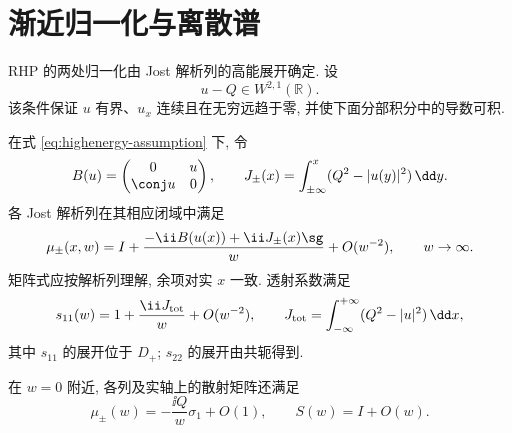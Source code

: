 \section{渐近归一化与离散谱}
RHP 的两处归一化由 Jost 解析列的高能展开确定. 设
\begin{equation}\label{eq:highenergy-assumption}
u-Q\in W^{2,1}(\mathbb R).
\end{equation}
该条件保证 $u$ 有界、$u_x$ 连续且在无穷远趋于零, 并使下面分部积分中的导数可积.
\begin{proposition}[一致高能展开]\label{prop:highenergy}
在式 \eqref{eq:highenergy-assumption} 下, 令
\[
B(u)=\begin{pmatrix}0&u\\\conj u&0\end{pmatrix},\qquad
J_\pm(x)=\int_{\pm\infty}^{x}(Q^2-|u(y)|^2)\,\dd y.
\]
各 Jost 解析列在其相应闭域中满足
\begin{equation}\label{eq:mu-highenergy}
\mu_\pm(x,w)
=I+\dfrac{-\ii B(u(x))+\ii J_\pm(x)\sg}{w}
+O(w^{-2}),\qquad w\to\infty.
\end{equation}
矩阵式应按解析列理解, 余项对实 $x$ 一致. 透射系数满足
\begin{equation}\label{eq:transmission-highenergy}
s_{11}(w)=1+\dfrac{\ii J_{\rm tot}}{w}+O(w^{-2}),
\qquad
J_{\rm tot}=\int_{-\infty}^{+\infty}(Q^2-|u|^2)\,\dd x,
\end{equation}
其中 $s_{11}$ 的展开位于 $D_+$; $s_{22}$ 的展开由共轭得到.

在 $w=0$ 附近, 各列及实轴上的散射矩阵还满足
\begin{equation}\label{eq:smallmu}
\mu_\pm(w)=-\dfrac{\ii Q}{w}\sigma_1+O(1),\qquad
S(w)=I+O(w).
\end{equation}
\end{proposition}
